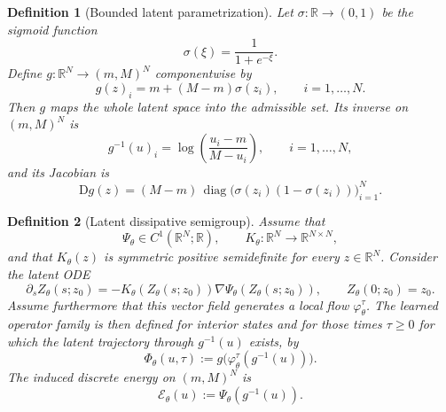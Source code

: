 \documentclass[11pt]{article}
\newtheorem{definition}{Definition}
\newcommand{\R}{\mathbb{R}}
\newcommand{\cE}{\mathcal{E}}
\newcommand{\PhiT}{\Phi_{\theta}}
\newcommand{\diag}{\operatorname{diag}}
\begin{document}
\begin{definition}[Bounded latent parametrization]\label{def:latent-map}
Let \(\sigma:\R\to (0,1)\) be the sigmoid function
\begin{equation}\label{eq:sigmoid}
\sigma(\xi)=\frac{1}{1+e^{-\xi}}.
\end{equation}
Define \(g:\R^N\to (m,M)^N\) componentwise by
\begin{equation}\label{eq:g-map}
g(z)_i=m+(M-m)\sigma(z_i), \qquad i=1,\dots,N.
\end{equation}
Then \(g\) maps the whole latent space into the admissible set. Its inverse on \((m,M)^N\) is
\begin{equation}\label{eq:g-inv}
g^{-1}(u)_i=\log\!\left(\frac{u_i-m}{M-u_i}\right), \qquad i=1,\dots,N,
\end{equation}
and its Jacobian is
\begin{equation}\label{eq:Dg}
\mathrm{D}g(z)=(M-m)\,\diag\bigl(\sigma(z_i)(1-\sigma(z_i))\bigr)_{i=1}^N.
\end{equation}
\end{definition}

\begin{definition}[Latent dissipative semigroup]\label{def:latent-semigroup}
Assume that
\begin{equation}\label{eq:latent-objects}
\Psi_{\theta}\in C^1(\R^N;\R), \qquad K_{\theta}:\R^N\to \R^{N\times N},
\end{equation}
and that \(K_{\theta}(z)\) is symmetric positive semidefinite for every \(z\in \R^N\). Consider the latent ODE
\begin{equation}\label{eq:latent-ode}
\partial_s Z_{\theta}(s;z_0)=-K_{\theta}(Z_{\theta}(s;z_0))\nabla \Psi_{\theta}(Z_{\theta}(s;z_0)), \qquad Z_{\theta}(0;z_0)=z_0.
\end{equation}
Assume furthermore that this vector field generates a local flow \(\varphi_{\theta}^{\tau}\). The learned operator family is then defined for interior states and for those times \(\tau\ge 0\) for which the latent trajectory through \(g^{-1}(u)\) exists, by
\begin{equation}\label{eq:latent-learner}
\PhiT(u,\tau):=g\bigl(\varphi_{\theta}^{\tau}(g^{-1}(u))\bigr).
\end{equation}
The induced discrete energy on $(m,M)^N$ is
\begin{equation}\label{eq:induced-energy}
\cE_{\theta}(u):=\Psi_{\theta}(g^{-1}(u)).
\end{equation}
\end{definition}
\end{document}
